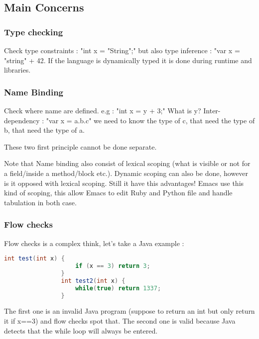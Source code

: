     \subsection{Main Concerns}
        \subsubsection{Type checking}
            \theoremstyle{definition}
            \begin{definition}
                Check type constraints : "int x = "String";" but also type
                inference : "var x = "string" + 42.
                If the language is dynamically typed it is done during runtime and libraries.
            \end{definition}

        \subsubsection{Name Binding}
            \theoremstyle{definition}
            \begin{definition}
                Check where name are defined. e.g : "int x = y + 3;" What is y?
                Inter-dependency : "var x = a.b.c" we need to know the type of
                c, that need the type of b, that need the type of a.
            \end{definition}
            These two first principle cannot be done separate.

            Note that Name binding also consist of lexical scoping (what is
            visible or not for a field/inside a method/block etc.). Dynamic
            scoping can also be done, however is it opposed with lexical
            scoping. Still it have this advantages! Emacs use this kind of
            scoping, this allow Emacs to edit Ruby and Python file and handle
            tabulation in both case.
        \subsubsection{Flow checks}
            Flow checks is a complex think, let's take a Java example : 
            \begin{lstlisting}[language=Java]
                int test(int x) {
                    if (x == 3) return 3;
                }
                int test2(int x) {
                    while(true) return 1337;
                }
            \end{lstlisting}
            The first one is an invalid Java program (suppose to return an int
            but only return it if x==3) and flow checks spot that. The second
            one is valid because Java detects that the while loop will always be
            entered.
